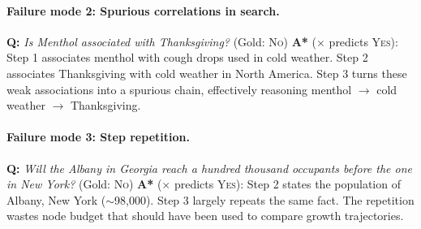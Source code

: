 \documentclass[11pt]{article}
\begin{document}
{\paragraph{Failure mode 2: Spurious correlations in search.}

\begin{examplebox}[title=StrategyQA --- Spurious Correlation]
\textbf{Q:} \emph{Is Menthol associated with Thanksgiving?} \quad (Gold: \textsc{No})
\tcblower
\textbf{A*} ($\times$ predicts \textsc{Yes}): Step 1 associates menthol with cough drops used in cold weather. Step 2 associates Thanksgiving with cold weather in North America. Step 3 turns these weak associations into a spurious chain, effectively reasoning menthol $\rightarrow$ cold weather $\rightarrow$ Thanksgiving.
\end{examplebox}

\paragraph{Failure mode 3: Step repetition.}

\begin{examplebox}[title=StrategyQA --- Step Repetition]
\textbf{Q:} \emph{Will the Albany in Georgia reach a hundred thousand occupants before the one in New York?} \quad (Gold: \textsc{No})
\tcblower
\textbf{A*} ($\times$ predicts \textsc{Yes}): Step 2 states the population of Albany, New York ($\sim$98{,}000). Step 3 largely repeats the same fact. The repetition wastes node budget that should have been used to compare growth trajectories.
\end{examplebox}


}
\end{document}

